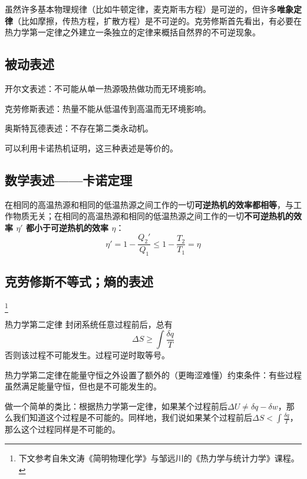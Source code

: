 
\begin{issues}
\issueDraft
\end{issues}


虽然许多基本物理规律（比如牛顿定律，麦克斯韦方程）是可逆的，但许多\textbf{唯象定律}（比如摩擦，传热方程，扩散方程）是不可逆的。克劳修斯首先看出，有必要在热力学第一定律之外建立一条独立的定律来概括自然界的不可逆现象。

\subsection{被动表述}
开尔文表述：不可能从单一热源吸热做功而无环境影响。

克劳修斯表述：热量不能从低温传到高温而无环境影响。

奥斯特瓦德表述：不存在第二类永动机。

可以利用卡诺热机证明，这三种表述是等价的。

\subsection{数学表述——卡诺定理}

在相同的高温热源和相同的低温热源之间工作的一切\textbf{可逆热机的效率都相等}，与工作物质无关；在相同的高温热源和相同的低温热源之间工作的一切\textbf{不可逆热机的效率 $\eta'$ 都小于可逆热机的效率 $\eta$}：
\begin{equation}
\eta'=1-\frac{Q_2'}{Q_1}\le 1-\frac{T_2}{T_1}=\eta
\end{equation}

\subsection{克劳修斯不等式；熵的表述}
\footnote{下文参考自朱文涛《简明物理化学》与邹远川的《热力学与统计力学》课程。}

\begin{theorem}{热力学第二定律}
封闭系统任意过程前后，总有
\begin{equation}
\Delta S \ge \int \frac{\delta q}{T}
\end{equation}
否则该过程不可能发生。过程可逆时取等号。
\end{theorem}
热力学第二定律在能量守恒之外设置了额外的（更晦涩难懂）约束条件：有些过程虽然满足能量守恒，但也是不可能发生的。

做一个简单的类比：根据热力学第一定律，如果某个过程前后$\Delta U \ne \delta q - \delta w$，那么我们知道这个过程是不可能的。同样地，我们说如果某个过程前后$\Delta S < \int \frac{\delta q}{T}$，那么这个过程同样是不可能的。

